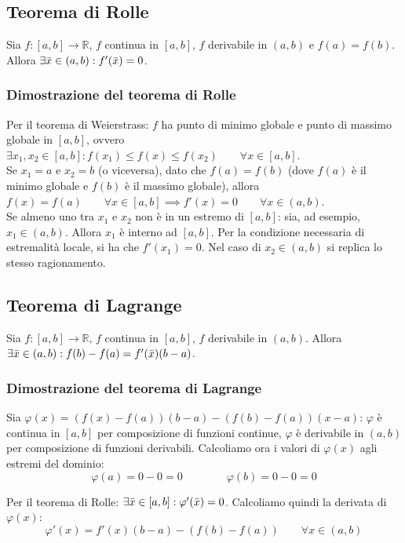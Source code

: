 \documentclass{article}
\begin{document}
\subsection{Teorema di Rolle}
Sia $f: [a, b] \xrightarrow{} \mathbb{R}$, $f$ continua in $[a, b]$, $f$ derivabile in $(a, b)$ e $f(a) = f(b)$. Allora $\exists \Bar{x} \in (a, b) : f'(\Bar{x}) = 0$.

\subsubsection{Dimostrazione del teorema di Rolle}
Per il teorema di Weierstrass: $f$ ha punto di minimo globale e punto di massimo globale in $[a, b]$, ovvero $\exists x_1, x_2 \in [a, b] : f(x_1) \leq f(x) \leq f(x_2) \qquad \forall x \in [a, b]$.\\
Se $x_1 = a$ e $x_2 = b$ (o viceversa), dato che $f(a) = f(b)$ (dove $f(a)$ è il minimo globale e $f(b)$ è il massimo globale), allora $f(x) = f(a) \qquad \forall x \in [a, b] \implies f'(x) = 0 \qquad \forall x \in (a, b)$.\\
Se almeno uno tra $x_1$ e $x_2$ non è in un estremo di $[a, b]$: sia, ad esempio, $x_1 \in (a, b)$. Allora $x_1$ è interno ad $[a, b]$. Per la condizione necessaria di estremalità locale, si ha che $f'(x_1) = 0$. Nel caso di $x_2 \in (a, b)$ si replica lo stesso ragionamento.

\subsection{Teorema di Lagrange}
Sia $f: [a, b] \xrightarrow{} \mathbb{R}$, $f$ continua in $[a, b]$, $f$ derivabile in $(a, b)$. Allora $\exists \Bar{x} \in (a, b) : f(b) - f(a) = f'(\Bar{x})(b - a)$.

\subsubsection{Dimostrazione del teorema di Lagrange}
Sia $\varphi(x) = (f(x) - f(a))(b - a) - (f(b) - f(a))(x - a)$: $\varphi$ è continua in $[a, b]$ per composizione di funzioni continue, $\varphi$ è derivabile in $(a, b)$ per composizione di funzioni derivabili. Calcoliamo ora i valori di $\varphi(x)$ agli estremi del dominio:
\begin{equation*}
    \varphi(a) = 0 - 0 = 0 \qquad \qquad \varphi(b) = 0 - 0 = 0
\end{equation*}

\noindent Per il teorema di Rolle: $\exists \Bar{x} \in [a, b] : \varphi'(\Bar{x}) = 0$. Calcoliamo quindi la derivata di $\varphi(x)$:
\begin{equation*}
    \varphi'(x) = f'(x)(b - a) - (f(b) - f(a)) \qquad \forall x \in (a, b)
\end{equation*}
\end{document}
